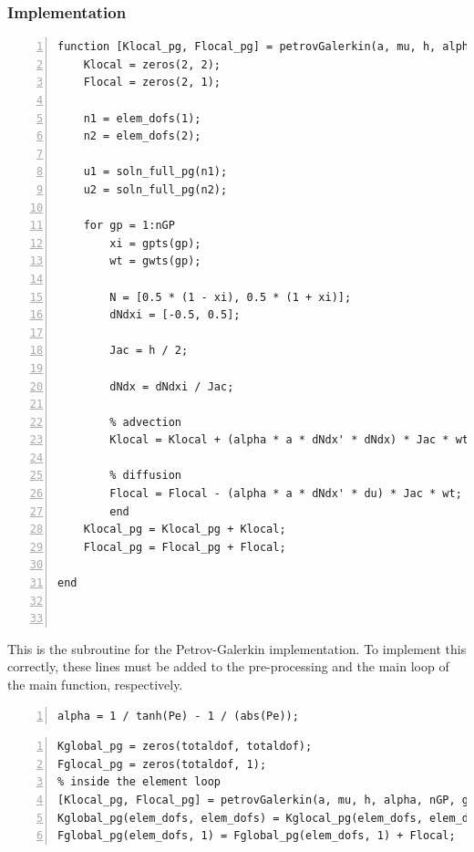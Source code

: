 \documentclass[12pt, oneside]{article}
\begin{document}
\subsubsection{Implementation}
\begin{lstlisting}[frame=single, numbers=left, style=Matlab-editor]
function [Klocal_pg, Flocal_pg] = petrovGalerkin(a, mu, h, alpha, nGP, gpts, gwts, elem_dofs, node_coords, soln_full_pg, Klocal, Flocala)
	Klocal = zeros(2, 2);
	Flocal = zeros(2, 1);
    
	n1 = elem_dofs(1);
	n2 = elem_dofs(2);

	u1 = soln_full_pg(n1);
	u2 = soln_full_pg(n2);

	for gp = 1:nGP
		xi = gpts(gp);
		wt = gwts(gp);
		
		N = [0.5 * (1 - xi), 0.5 * (1 + xi)];
		dNdxi = [-0.5, 0.5];
		
		Jac = h / 2;
		
		dNdx = dNdxi / Jac;
		
		% advection
		Klocal = Klocal + (alpha * a * dNdx' * dNdx) * Jac * wt;
		
		% diffusion
		Flocal = Flocal - (alpha * a * dNdx' * du) * Jac * wt;
		end
	Klocal_pg = Klocal_pg + Klocal;
	Flocal_pg = Flocal_pg + Flocal;

end

    
   \end{lstlisting}
This is the subroutine for the Petrov-Galerkin implementation. To implement this correctly, these lines must be added to the pre-processing and the main loop of the main function, respectively.
\begin{lstlisting}[frame=single, numbers=left, style=Matlab-editor]
% at the preprocessing section
alpha = 1 / tanh(Pe) - 1 / (abs(Pe));
\end{lstlisting}
\begin{lstlisting}[frame=single, numbers=left, style=Matlab-editor]
% in the main loop, inside the iteration loop
Kglobal_pg = zeros(totaldof, totaldof);
Fglocal_pg = zeros(totaldof, 1);
% inside the element loop
[Klocal_pg, Flocal_pg] = petrovGalerkin(a, mu, h, alpha, nGP, gpts, gwts, elem_dofs, node_coords, soln_full_pg, Klocal, Flocala);
Kglobal_pg(elem_dofs, elem_dofs) = Kglocal_pg(elem_dofs, elem_dofs) + Klocal;
Fglobal_pg(elem_dofs, 1) = Fglobal_pg(elem_dofs, 1) + Flocal;
\end{lstlisting}
\end{document}

